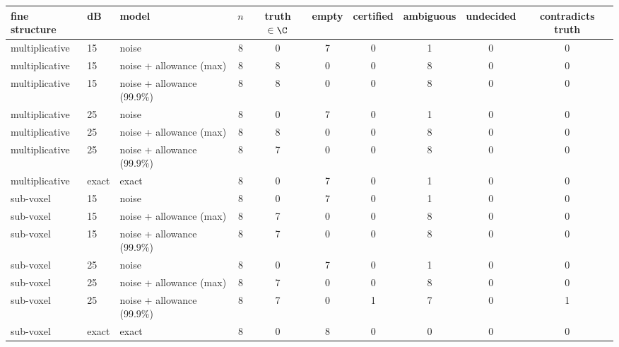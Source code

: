 \begin{tabular}{@{}lll ccccccc@{}}\toprule
fine structure & dB & model & $n$ & truth $\in\C$ & empty & certified & ambiguous & undecided & contradicts truth\\\midrule
multiplicative & 15 & noise & 8 & 0 & 7 & 0 & 1 & 0 & 0\\
multiplicative & 15 & noise + allowance (max) & 8 & 8 & 0 & 0 & 8 & 0 & 0\\
multiplicative & 15 & noise + allowance (99.9\%) & 8 & 8 & 0 & 0 & 8 & 0 & 0\\
multiplicative & 25 & noise & 8 & 0 & 7 & 0 & 1 & 0 & 0\\
multiplicative & 25 & noise + allowance (max) & 8 & 8 & 0 & 0 & 8 & 0 & 0\\
multiplicative & 25 & noise + allowance (99.9\%) & 8 & 7 & 0 & 0 & 8 & 0 & 0\\
multiplicative & exact & exact & 8 & 0 & 7 & 0 & 1 & 0 & 0\\
sub-voxel & 15 & noise & 8 & 0 & 7 & 0 & 1 & 0 & 0\\
sub-voxel & 15 & noise + allowance (max) & 8 & 7 & 0 & 0 & 8 & 0 & 0\\
sub-voxel & 15 & noise + allowance (99.9\%) & 8 & 7 & 0 & 0 & 8 & 0 & 0\\
sub-voxel & 25 & noise & 8 & 0 & 7 & 0 & 1 & 0 & 0\\
sub-voxel & 25 & noise + allowance (max) & 8 & 7 & 0 & 0 & 8 & 0 & 0\\
sub-voxel & 25 & noise + allowance (99.9\%) & 8 & 7 & 0 & 1 & 7 & 0 & 1\\
sub-voxel & exact & exact & 8 & 0 & 8 & 0 & 0 & 0 & 0\\
\bottomrule\end{tabular}
